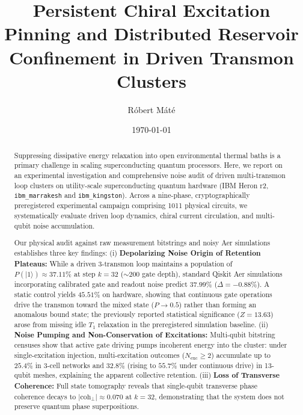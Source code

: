 \documentclass[aps,pra,twocolumn,superscriptaddress,floatfix,10pt]{revtex4-2}
\begin{document}
\title{Persistent Chiral Excitation Pinning and Distributed Reservoir Confinement in Driven Transmon Clusters}

\author{R\'{o}bert M\'{a}t\'{e}}

\date{\today}


\begin{abstract}
Suppressing dissipative energy relaxation into open environmental thermal baths is a primary challenge in scaling superconducting quantum processors. Here, we report on an experimental investigation and comprehensive noise audit of driven multi-transmon loop clusters on utility-scale superconducting quantum hardware (IBM Heron r2, \texttt{ibm\_marrakesh} and \texttt{ibm\_kingston}). Across a nine-phase, cryptographically preregistered experimental campaign comprising 1011 physical circuits, we systematically evaluate driven loop dynamics, chiral current circulation, and multi-qubit noise accumulation.

Our physical audit against raw measurement bitstrings and noisy Aer simulations establishes three key findings:
(i) \textbf{Depolarizing Noise Origin of Retention Plateaus:} While a driven 3-transmon loop maintains a population of $P(|1\rangle) \approx 37.11\%$ at step $k=32$ ($\sim 200$ gate depth), standard Qiskit Aer simulations incorporating calibrated gate and readout noise predict $37.99\%$ ($\Delta = -0.88\%$). A static control yields $45.51\%$ on hardware, showing that continuous gate operations drive the transmon toward the mixed state ($P \to 0.5$) rather than forming an anomalous bound state; the previously reported statistical significance ($Z=13.63$) arose from missing idle $T_1$ relaxation in the preregistered simulation baseline.
(ii) \textbf{Noise Pumping and Non-Conservation of Excitations:} Multi-qubit bitstring censuses show that active gate driving pumps incoherent energy into the cluster: under single-excitation injection, multi-excitation outcomes ($N_\text{exc} \ge 2$) accumulate up to $25.4\%$ in 3-cell networks and $32.8\%$ (rising to $55.7\%$ under continuous drive) in 13-qubit meshes, explaining the apparent collective retention.
(iii) \textbf{Loss of Transverse Coherence:} Full state tomography reveals that single-qubit transverse phase coherence decays to $|\text{coh}_\perp| \approx 0.070$ at $k=32$, demonstrating that the system does not preserve quantum phase superpositions.
\end{abstract}
\end{document}
